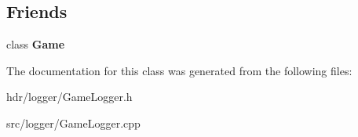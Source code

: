\subsection*{Friends}
\begin{DoxyCompactItemize}
\item 
class {\bfseries Game}\label{class_game_logger_aa2fab026580d6f14280c2ffb8063a314}

\end{DoxyCompactItemize}


The documentation for this class was generated from the following files\-:\begin{DoxyCompactItemize}
\item 
hdr/logger/Game\-Logger.\-h\item 
src/logger/Game\-Logger.\-cpp\end{DoxyCompactItemize}
